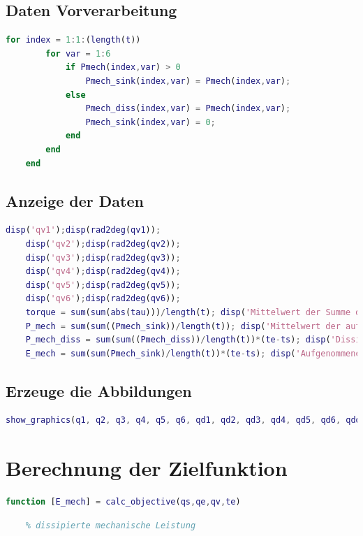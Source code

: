 \subsection{Daten Vorverarbeitung}
%
\begin{lstlisting}[language=Matlab, numbers=none]
	for index = 1:1:(length(t))
		for var = 1:6
			if Pmech(index,var) > 0
				Pmech_sink(index,var) = Pmech(index,var);
			else
				Pmech_diss(index,var) = Pmech(index,var);
				Pmech_sink(index,var) = 0;
			end
		end
	end
\end{lstlisting}
%
\subsection{Anzeige der Daten}
%
\begin{lstlisting}[language=Matlab, numbers=none]
	disp('qv1');disp(rad2deg(qv1));
	disp('qv2');disp(rad2deg(qv2));
	disp('qv3');disp(rad2deg(qv3));
	disp('qv4');disp(rad2deg(qv4));
	disp('qv5');disp(rad2deg(qv5));
	disp('qv6');disp(rad2deg(qv6));
	torque = sum(sum(abs(tau)))/length(t); disp('Mittelwert der Summe des Betrags der Getriebe-Drehmomente in Nm'); disp(torque);
	P_mech = sum(sum((Pmech_sink))/length(t)); disp('Mittelwert der aufgenommenen mechanischen Leistung in W'); disp(P_mech);
	P_mech_diss = sum(sum((Pmech_diss))/length(t))*(te-ts); disp('Dissipierte Energie in J'); disp(P_mech_diss);
	E_mech = sum(sum(Pmech_sink)/length(t))*(te-ts); disp('Aufgenommene Energie in J'); disp(E_mech);
\end{lstlisting}
%
\subsection{Erzeuge die Abbildungen}
%
\begin{lstlisting}[language=Matlab, numbers=none]
	show_graphics(q1, q2, q3, q4, q5, q6, qd1, qd2, qd3, qd4, qd5, qd6, qdd1, qdd2, qdd3, qdd4, qdd5, qdd6, t, tau, Pmech)
\end{lstlisting}
%
%
\section{Berechnung der Zielfunktion}
%
\label{add:zielfunktion}
\begin{lstlisting}[language=Matlab, numbers=none]
	function [E_mech] = calc_objective(qs,qe,qv,te)
\end{lstlisting}
\begin{lstlisting}[language=Matlab, numbers=none]
	% Berechung der Zielfunktion (Energieverbrauch) über die nicht
	% dissipierte mechanische Leistung
\end{lstlisting}
%
